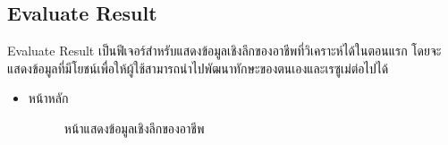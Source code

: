 \subsection {Evaluate Result}
Evaluate Result เป็นฟีเจอร์สำหรับแสดงข้อมูลเชิงลึกของอาชีพที่วิเคราะห์ได้ในตอนแรก โดยจะแสดงข้อมูลที่มีโยชน์เพื่อให้ผู้ใช้สามารถนำไปพัฒนาทักษะของตนเองและเรซูเม่ต่อไปได้
\begin{itemize}
    \item หน้าหลัก
          \begin{figure}[H]\centering
              \setlength{\fboxrule}{0.2mm} %
              \setlength{\fboxsep}{0.5cm}
              \caption{\centering หน้าแสดงข้อมูลเชิงลึกของอาชีพ}\label{fig:wireframe3_1}
          \end{figure}
\end{itemize}

